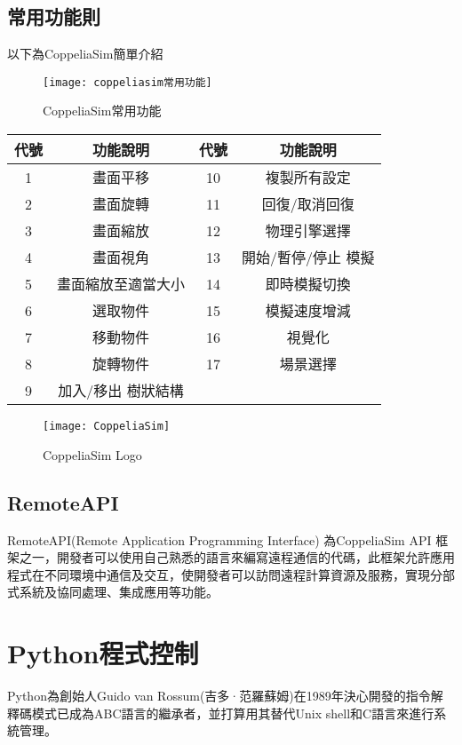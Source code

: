 \subsection{常用功能則}
以下為CoppeliaSim簡單介紹

\begin{figure}[hbt!]
\center
\texttt{[image: coppeliasim常用功能]}
\caption{\Large CoppeliaSim常用功能}
\label{coppeliasim常用功能}
\end{figure}

\begin{table}[htbp]
  \centering
  \large
  \setlength{\tabcolsep}{0.7cm}
  \begin{tabular}{|c|c|c|c|}
    \hline
    代號 & 功能說明 & 代號 & 功能說明 \\
    \hline
    1 & 畫面平移 & 10 & 複製所有設定 \\
    \hline
    2 & 畫面旋轉 & 11 & 回復/取消回復 \\
    \hline
    3 & 畫面縮放 & 12 & 物理引擎選擇 \\
    \hline
    4 & 畫面視角 & 13 & 開始/暫停/停止 模擬 \\
    \hline
    5 & 畫面縮放至適當大小 & 14 & 即時模擬切換 \\
    \hline
    6 & 選取物件 & 15 & 模擬速度增減 \\
    \hline
    7 & 移動物件 & 16 & 視覺化 \\
    \hline
    8 & 旋轉物件 & 17 & 場景選擇 \\
    \hline
    9 & 加入/移出 樹狀結構 & & \\
    \hline
  \end{tabular}
\end{table}

\begin{figure}[hbt!]
\center
\texttt{[image: CoppeliaSim]}
\caption{\Large CoppeliaSim Logo}
\end{figure}

\subsection{RemoteAPI}
RemoteAPI(Remote Application Programming Interface) 為CoppeliaSim API 框架之一，開發者可以使用自己熟悉的語言來編寫遠程通信的代碼，此框架允許應用程式在不同環境中通信及交互，使開發者可以訪問遠程計算資源及服務，實現分部式系統及協同處理、集成應用等功能。\\

\section{Python程式控制}
Python為創始人Guido van Rossum(吉多·范羅蘇姆)在1989年決心開發的指令解釋碼模式已成為ABC語言的繼承者，並打算用其替代Unix shell和C語言來進行系統管理。\

